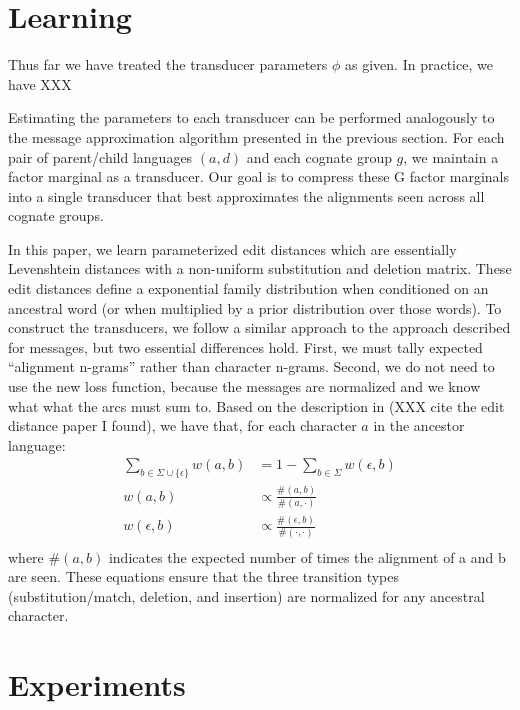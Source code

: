 \documentclass[11pt,a4paper]{article}
\begin{document}
\section{Learning}

Thus far we have treated the transducer parameters $\phi$ as given.
In practice, we have XXX

Estimating the parameters to each transducer can be performed
analogously to the message approximation algorithm presented in the
previous section. For each pair of parent/child languages $(a,d)$
and each cognate group $g$, we maintain a factor marginal as a
transducer. Our goal is to compress these G factor marginals into
a single transducer that best approximates the alignments seen
across all cognate groups. 

In this paper, we learn parameterized edit distances which are
essentially Levenshtein distances with a non-uniform substitution
and deletion matrix. These edit distances define a exponential
family distribution when conditioned on an ancestral word (or when
multiplied by a prior distribution over those words).  To construct
the transducers, we follow a similar approach to the approach
described for messages, but two essential differences hold.  First,
we must tally expected ``alignment n-grams'' rather than character
n-grams. Second, we do not need to use the new loss function, because
the messages are normalized and we know what what the arcs must sum
to. Based on the description in (XXX cite the edit distance paper
I found), we have that, for each character $a$ in the ancestor language:
\begin{equation}
  \begin{split}
    \sum_{b \in \Sigma \cup \{\epsilon\}} w(a,b) &= 1 - \sum_{b \in \Sigma} w(\epsilon,b) \\
    w(a,b) &\propto \frac{\#(a,b)}{\#(a,\cdot)} \\
    w(\epsilon,b) &\propto \frac{\#(\epsilon,b)}{\#(\cdot,\cdot)} \\
   \end{split}
 \end{equation}
where $\#(a,b)$ indicates the expected number of times the alignment
of a and b are seen. These equations ensure that the three transition
types (substitution/match, deletion, and insertion) are normalized for
any ancestral character.

\section{Experiments}
\end{document}
